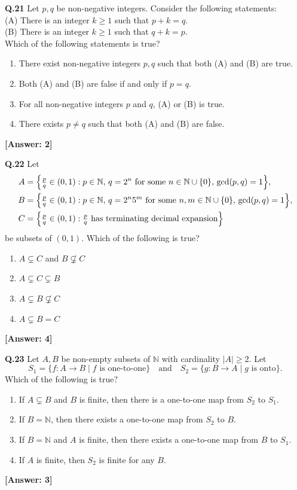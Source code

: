 \documentclass[12pt,a4paper]{article}
\newcommand{\ans}[1]{\quad\textcolor{anscolor}{\textbf{[Answer: #1]}}}
\begin{document}
\textbf{Q.21} Let $p,q$ be non-negative integers. Consider the following statements:\\
(A) There is an integer $k\ge1$ such that $p+k=q$.\\
(B) There is an integer $k\ge1$ such that $q+k=p$.\\
Which of the following statements is true?
\begin{enumerate}[label=\arabic*.]
\item There exist non-negative integers $p,q$ such that both (A) and (B) are true.
\item Both (A) and (B) are false if and only if $p=q$.
\item For all non-negative integers $p$ and $q$, (A) or (B) is true.
\item There exists $p\neq q$ such that both (A) and (B) are false.
\end{enumerate}\ans{2}

\textbf{Q.22} Let
\begin{align*}
A&=\Bigl\{\tfrac{p}{q}\in(0,1):p\in\mathbb{N},\,q=2^n\text{ for some }n\in\mathbb{N}\cup\{0\},\,\gcd(p,q)=1\Bigr\},\\
B&=\Bigl\{\tfrac{p}{q}\in(0,1):p\in\mathbb{N},\,q=2^n5^m\text{ for some }n,m\in\mathbb{N}\cup\{0\},\,\gcd(p,q)=1\Bigr\},\\
C&=\Bigl\{\tfrac{p}{q}\in(0,1):\tfrac{p}{q}\text{ has terminating decimal expansion}\Bigr\}
\end{align*}
be subsets of $(0,1)$. Which of the following is true?
\begin{enumerate}[label=\arabic*.]
\item $A\subsetneq C$ and $B\not\subsetneq C$
\item $A\subsetneq C\subsetneq B$
\item $A\subsetneq B\not\subsetneq C$
\item $A\subsetneq B=C$
\end{enumerate}\ans{4}

\textbf{Q.23} Let $A,B$ be non-empty subsets of $\mathbb{N}$ with cardinality $|A|\ge2$. Let
\[S_1=\{f:A\to B\mid f\text{ is one-to-one}\}\quad\text{and}\quad S_2=\{g:B\to A\mid g\text{ is onto}\}.\]
Which of the following is true?
\begin{enumerate}[label=\arabic*.]
\item If $A\subsetneq B$ and $B$ is finite, then there is a one-to-one map from $S_2$ to $S_1$.
\item If $B=\mathbb{N}$, then there exists a one-to-one map from $S_2$ to $B$.
\item If $B=\mathbb{N}$ and $A$ is finite, then there exists a one-to-one map from $B$ to $S_1$.
\item If $A$ is finite, then $S_2$ is finite for any $B$.
\end{enumerate}\ans{3}
\end{document}
